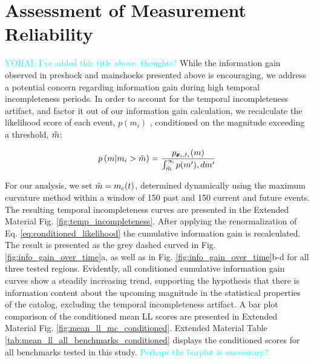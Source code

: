 \documentclass[pdflatex]{sn-jnl}
\newcommand{\neri}[1]{{\textcolor{cyan}{#1}}}
\begin{document}
\section{Assessment of Measurement Reliability}
\neri{YOHAI: I've added this title above. thoughts?}\newline
While the information gain observed in preshock and mainshocks presented above is encouraging, we address a potential concern regarding information gain during high temporal incompleteness periods\cite{stockman_forecasting_2023}. In order to account for the temporal incompleteness artifact, and factor it out of our information gain calculation, we recalculate the likelihood score of each event, $p(m_i)$ , conditioned on the magnitude exceeding a threshold, $\Tilde{m}$:

\begin{equation}
    p \left( m \vert m_i > \Tilde{m} \right) = \frac{p_{\pmb{x}_i, t_i}(m)} {\int_{\Tilde{m}}^{\infty} p(m') ,dm'}
    \label{eq:conditioned_likelihood}
\end{equation}

For our analysis, we set $\Tilde{m} = m_c(t)$, determined dynamically using the maximum curvature method \cite{wiemer_minimum_2000} within a window of 150 past and 150 current and future events. The resulting temporal incompleteness curves are presented in the Extended Material Fig. \ref{fig:temp_incompleteness}. After applying the renormalization of Eq. \ref{eq:conditioned_likelihood} the cumulative information gain is recalculated. The result is presented as the grey dashed curved in Fig.  \ref{fig:info_gain_over_time}a, as well as in Fig. \ref{fig:info_gain_over_time}b-d for all three tested regions. Evidently, all conditioned cumulative information gain curves show a steadily increasing trend, supporting the hypothesis that there is information content about the upcoming magnitude in the statistical properties of the catalog, excluding the temporal incompleteness artifact. A bar plot comparison of the conditioned mean LL scores are presented in Extended Material Fig. \ref{fig:mean_ll_mc_conditioned}. Extended Material Table \ref{tab:mean_ll_all_benchmarks_conditioned} displays the conditioned scores for all benchmarks tested in this study. \neri{Perhaps the barplot is unecessary?}
\end{document}
